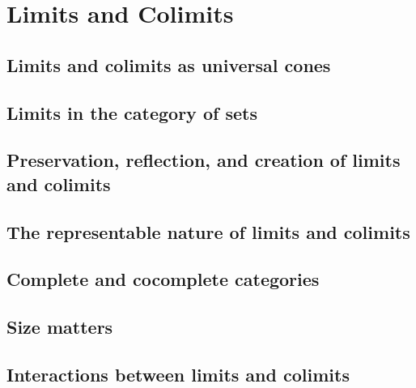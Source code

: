 \documentclass[main.tex]{subfiles}
\begin{document}
\chapter{Limits and Colimits}
\section{Limits and colimits as universal cones}









\pagebreak
\section{Limits in the category of sets}







\pagebreak
\section{Preservation, reflection, and creation of limits and colimits}




% 

\pagebreak
\section{The representable nature of limits and colimits}


% 

\pagebreak
\section{Complete and cocomplete categories}



% 



\pagebreak
\section{Size matters}


\pagebreak
\section{Interactions between limits and colimits}
% 
\end{document}
